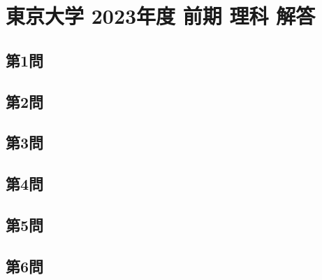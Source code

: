 ﻿\documentclass[../../uem_tok_a.tex]{subfiles}
\begin{document}
    \section{東京大学 2023年度 前期 理科 解答}

    \subsection{第1問}
    

    \clearpage
    \subsection{第2問}
    

    \clearpage
    \subsection{第3問}
    

    \clearpage
    \subsection{第4問}
    

    \clearpage
    \subsection{第5問}
    

    \clearpage
    \subsection{第6問}
    

    \clearpage
\end{document}
